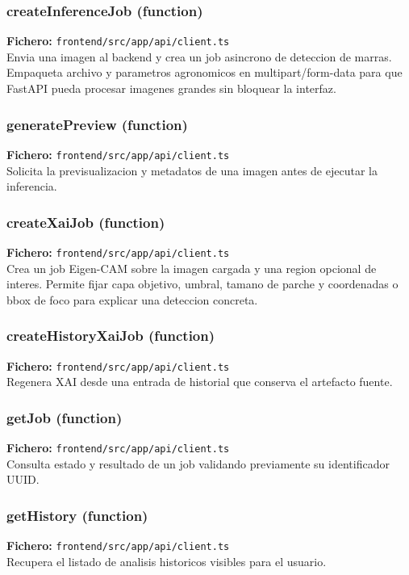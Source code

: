 \subsubsection*{createInferenceJob (function)}
\noindent\textbf{Fichero:} \texttt{frontend/src/app/api/client.ts}\\
Envia una imagen al backend y crea un job asincrono de deteccion de marras. Empaqueta archivo y parametros agronomicos en multipart/form-data para que FastAPI pueda procesar imagenes grandes sin bloquear la interfaz.


\subsubsection*{generatePreview (function)}
\noindent\textbf{Fichero:} \texttt{frontend/src/app/api/client.ts}\\
Solicita la previsualizacion y metadatos de una imagen antes de ejecutar la inferencia.


\subsubsection*{createXaiJob (function)}
\noindent\textbf{Fichero:} \texttt{frontend/src/app/api/client.ts}\\
Crea un job Eigen-CAM sobre la imagen cargada y una region opcional de interes. Permite fijar capa objetivo, umbral, tamano de parche y coordenadas o bbox de foco para explicar una deteccion concreta.


\subsubsection*{createHistoryXaiJob (function)}
\noindent\textbf{Fichero:} \texttt{frontend/src/app/api/client.ts}\\
Regenera XAI desde una entrada de historial que conserva el artefacto fuente.


\subsubsection*{getJob (function)}
\noindent\textbf{Fichero:} \texttt{frontend/src/app/api/client.ts}\\
Consulta estado y resultado de un job validando previamente su identificador UUID.


\subsubsection*{getHistory (function)}
\noindent\textbf{Fichero:} \texttt{frontend/src/app/api/client.ts}\\
Recupera el listado de analisis historicos visibles para el usuario.



